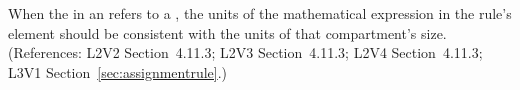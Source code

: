 When the  in an \AssignmentRule refers to a \Compartment,
the units of the mathematical expression in the rule's  element
should be consistent with the units of that compartment's size.
(References: L2V2 Section~4.11.3; L2V3 Section~4.11.3; L2V4 Section~4.11.3;
L3V1 Section~\ref{sec:assignmentrule}.)
